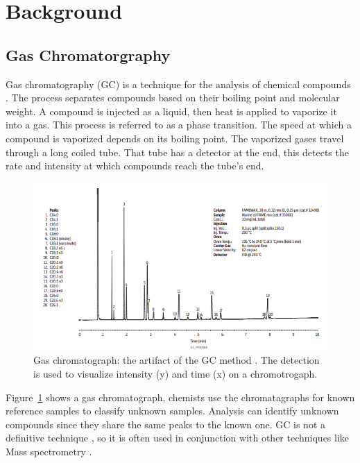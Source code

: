\documentclass[runningheads]{llncs}
\begin{document}
\section{Background}
\label{background}

\subsection{Gas Chromatorgraphy}

Gas chromatography (GC) is a technique for the analysis of chemical compounds \cite{eder1995gas,restek2018high,khan2013gas}.
The process separates compounds based on their boiling point and molecular weight.
A compound is injected as a liquid, then heat is applied to vaporize it into a gas. 
This process is referred to as a phase transition. 
The speed at which a compound is vaporized depends on its boiling point. 
The vaporized gases travel through a long coiled tube.
That tube has a detector at the end, this detects the rate and intensity at which compounds reach the tube's end. 


\begin{figure}[htb]
  \centering
  \includegraphics[width=12.5cm]{chromatograph.png}
  \caption{
    Gas chromatograph: the artifact of the GC method \cite{restek2018high}.
    The detection is used to visualize intensity (y) and time (x) on a chromotrogaph.}
  \label{fig:gas-chromatography} 
  \captionsetup[figure]{font=small,labelfont=small}
\end{figure}

Figure~\ref{fig:gas-chromatography} shows a gas chromatograph, chemists use the chromatagraphs for known reference samples to classify unknown samples. 
Analysis can identify unknown compounds since they share the same peaks to the known one.
GC is not a definitive technique \cite{khan2013gas}, so it is often used in conjunction with other techniques like Mass spectrometry \cite{restek2018high}.
\end{document}

